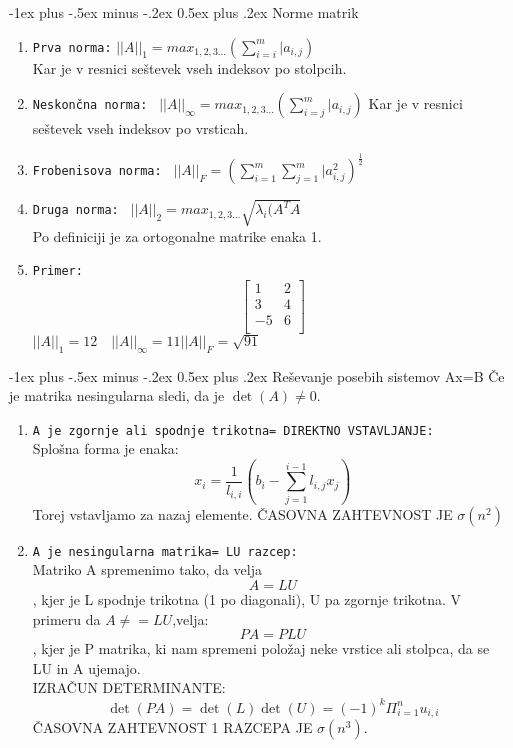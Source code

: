 \documentclass[12pt,landscape]{article}
\makeatletter
\renewcommand{\section}{\@startsection{section}{1}{0mm}%
                                {-1ex plus -.5ex minus -.2ex}%
                                {0.5ex plus .2ex}%
                                {\normalfont\large\bfseries}}
\makeatother
\begin{document}
\raggedright
\footnotesize
\begin{multicols}{3}
\setlength{\premulticols}{1pt}
\setlength{\postmulticols}{1pt}
\setlength{\multicolsep}{1pt}
\setlength{\columnsep}{2pt}


\section{Norme matrik}
\begin{enumerate}
\item \texttt{Prva norma:} $||A||_1=max_{1,2,3...}\left(\sum_{i=i}^{m}|a_{i,j}\right)$ \\
Kar je v resnici seštevek vseh indeksov po stolpcih. 
\item \texttt{Neskončna norma: } $||A||_{\infty}=max_{1,2,3...}\left(\sum_{i=j}^{m}|a_{i,j}\right)$
Kar je v resnici seštevek vseh indeksov po vrsticah.
 \item \texttt{Frobenisova norma: } 
 $||A||_{F}=\left(\sum_{i=1}^{m}\sum_{j=1}^{m}|a_{i,j}^2\right)^{\frac{1}{2}}$
 \item \texttt{Druga norma: }
 $||A||_{2}=max_{1,2,3...}\sqrt{\lambda_i (A^T A}$ \\
 Po definiciji je za ortogonalne matrike enaka 1. \\
\item \texttt{Primer:} \\
$$\begin{bmatrix}
1 & 2\\
3 & 4\\
-5 & 6\\
\end{bmatrix}$$
$||A||_1=12 \quad ||A||_{\infty}=11 ||A||_F=\sqrt{91}$
\end{enumerate}
\section{Reševanje posebih sistemov Ax=B}
Če je matrika nesingularna sledi, da je $\det(A) \neq 0 $.
\begin{enumerate}
\item \texttt{A je zgornje ali spodnje trikotna= DIREKTNO VSTAVLJANJE:} \\
Splošna forma je enaka:
$$x_i=\frac{1}{l_{i,i}}\left(b_i-\sum_{j=1}^{i-1} l_{i,j}x_j \right)$$
Torej vstavljamo za nazaj elemente.
ČASOVNA ZAHTEVNOST JE $\sigma(n^2)$
\item \texttt{A je nesingularna matrika= LU razcep:} \\
Matriko A spremenimo tako, da velja $$A=LU$$, kjer je L spodnje trikotna (1 po diagonali), U pa zgornje trikotna. 
V primeru da $A\neq=LU$,velja: $$PA=PLU$$, kjer je P matrika, ki nam spremeni položaj neke vrstice ali stolpca, da se LU in A ujemajo. \\
IZRAČUN DETERMINANTE:
$$\det(PA)=\det(L) \det(U)=(-1)^k \Pi_{i=1}^{n}u_{i,i}$$ 
ČASOVNA ZAHTEVNOST 1 RAZCEPA JE $\sigma(n^3)$.


\end{enumerate}
\end{multicols}
\end{document}

